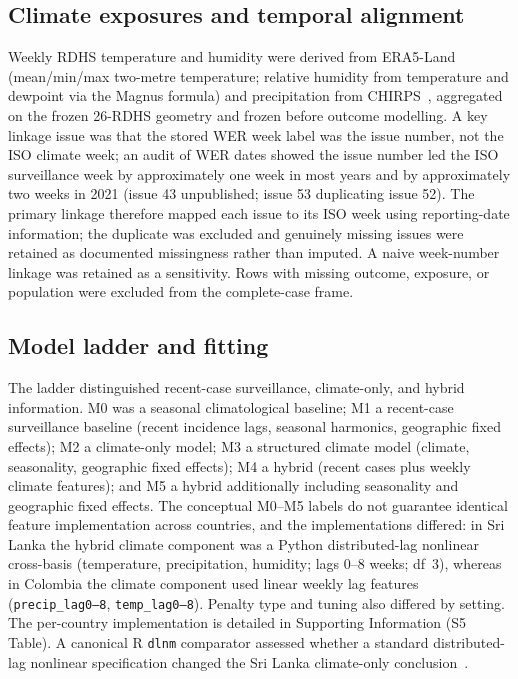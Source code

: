 \documentclass[11pt,a4paper]{article}
\begin{document}
\subsection{Climate exposures and temporal alignment}
Weekly RDHS temperature and humidity were derived from ERA5-Land~\cite{MunozSabater2021,ERA5LandCDS} (mean/min/max two-metre temperature; relative humidity from temperature and dewpoint via the Magnus formula) and precipitation from CHIRPS~\cite{Funk2015,CHIRPS}, aggregated on the frozen 26-RDHS geometry and frozen before outcome modelling. A key linkage issue was that the stored WER week label was the issue number, not the ISO climate week; an audit of WER dates showed the issue number led the ISO surveillance week by approximately one week in most years and by approximately two weeks in 2021 (issue 43 unpublished; issue 53 duplicating issue 52). The primary linkage therefore mapped each issue to its ISO week using reporting-date information; the duplicate was excluded and genuinely missing issues were retained as documented missingness rather than imputed. A naive week-number linkage was retained as a sensitivity. Rows with missing outcome, exposure, or population were excluded from the complete-case frame.

\subsection{Model ladder and fitting}
The ladder distinguished recent-case surveillance, climate-only, and hybrid information. M0 was a seasonal climatological baseline; M1 a recent-case surveillance baseline (recent incidence lags, seasonal harmonics, geographic fixed effects); M2 a climate-only model; M3 a structured climate model (climate, seasonality, geographic fixed effects); M4 a hybrid (recent cases plus weekly climate features); and M5 a hybrid additionally including seasonality and geographic fixed effects. The conceptual M0--M5 labels do not guarantee identical feature implementation across countries, and the implementations differed: in Sri Lanka the hybrid climate component was a Python distributed-lag nonlinear cross-basis (temperature, precipitation, humidity; lags 0--8 weeks; df~3), whereas in Colombia the climate component used linear weekly lag features (\texttt{precip\_lag0--8}, \texttt{temp\_lag0--8}). Penalty type and tuning also differed by setting. The per-country implementation is detailed in Supporting Information (S5 Table). A canonical R \texttt{dlnm} comparator assessed whether a standard distributed-lag nonlinear specification changed the Sri Lanka climate-only conclusion~\cite{Gasparrini2010,Gasparrini2011}.
\end{document}
